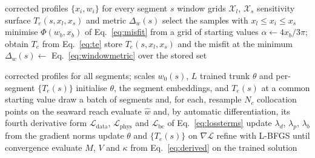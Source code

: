 \documentclass[final]{agujournal2019}
\begin{document}
\begin{algorithm}
\caption{Window-sweep sensitivity experiment. The baseline inversion is repeated
over a regular grid of window limits and the recovered elastic thickness is
recorded for every combination.}\label{alg:sweep}
\begin{algorithmic}[1]
  \Require corrected profiles $\{x_i, w_i\}$ for every segment $s$
  \Require window grids $\mathcal{X}_l$, $\mathcal{X}_s$
  \Ensure sensitivity surface $T_e(s, x_l, x_s)$ and metric $\Delta_w(s)$
      \State select the samples with $x_l \leq x_i \leq x_s$
      \State minimise $\Phi(w_b, x_b)$ of Eq.~\eqref{eq:misfit} from a grid of
             starting values
      \State $\alpha \gets 4x_b/3\pi$; obtain $T_e$ from Eq.~\eqref{eq:te}
      \State store $T_e(s, x_l, x_s)$ and the misfit at the minimum
    \EndFor
    \State $\Delta_w(s) \gets$ Eq.~\eqref{eq:windowmetric} over the stored set
  \EndFor
\end{algorithmic}
\end{algorithm}

\begin{algorithm}
\caption{Joint physics-informed training across all segments, with a shared
trunk network and one elastic thickness per segment.}\label{alg:joint}
\begin{algorithmic}[1]
  \Require corrected profiles for all segments; scales $w_0(s)$, $L$
  \Ensure trained trunk $\theta$ and per-segment $\{T_e(s)\}$
  \State initialise $\theta$, the segment embeddings, and $T_e(s)$ at a common
         starting value
    \State draw a batch of segments and, for each, resample $N_c$ collocation
           points on the seaward reach
    \State evaluate $\hat{w}$ and, by automatic differentiation, its fourth
           derivative
    \State form $\mathcal{L}_{\mathrm{data}}$, $\mathcal{L}_{\mathrm{phys}}$ and
           $\mathcal{L}_{\mathrm{bc}}$ of Eq.~\eqref{eq:lossterms}
      \State update $\lambda_d$, $\lambda_p$, $\lambda_b$ from the gradient norms
    \EndIf
    \State update $\theta$ and $\{T_e(s)\}$ on $\nabla\mathcal{L}$
  \EndWhile
  \State refine with L-BFGS until convergence
  \State evaluate $M$, $V$ and $\kappa$ from Eq.~\eqref{eq:derived} on the
         trained solution
\end{algorithmic}
\end{algorithm}
\end{document}
